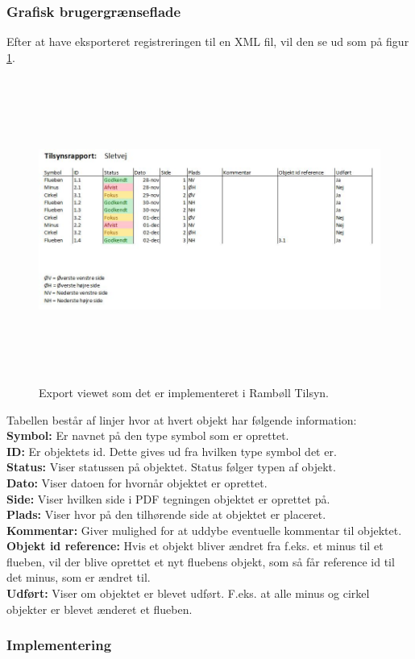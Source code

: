 \subsubsection{Grafisk brugergrænseflade}
Efter at have eksporteret registreringen til en XML fil, vil den se ud som på figur \ref{fig:Excel}.
\begin{figure}[H] %
	\centering
	\includegraphics[height=10cm, width=17cm]{../ArkitekturDesign/Design/Eksportering/Excel}
	\caption{Export viewet som det er implementeret i Rambøll Tilsyn.}
	\label{fig:Excel}
\end{figure}
Tabellen består af linjer hvor at hvert objekt har følgende information: \\
\textbf{Symbol:} Er navnet på den type symbol som er oprettet. \\
\textbf{ID:} Er objektets id. Dette gives ud fra hvilken type symbol det er. \\
\textbf{Status:} Viser statussen på objektet. Status følger typen af objekt. \\
\textbf{Dato:} Viser datoen for hvornår objektet er oprettet. \\
\textbf{Side:} Viser hvilken side i PDF tegningen objektet er oprettet på. \\
\textbf{Plads:} Viser hvor på den tilhørende side at objektet er placeret. \\
\textbf{Kommentar:} Giver mulighed for at uddybe eventuelle kommentar til objektet. \\
\textbf{Objekt id reference:} Hvis et objekt bliver ændret fra f.eks. et minus til et flueben, vil der blive oprettet et nyt fluebens objekt, som så får reference id til det minus, som er ændret til. \\
\textbf{Udført:} Viser om objektet er blevet udført. F.eks. at alle minus og cirkel objekter er blevet ænderet et flueben. \\

\subsubsection{Implementering}

\clearpage